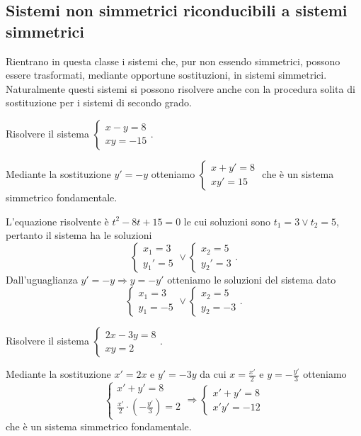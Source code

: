 \subsection{Sistemi non simmetrici riconducibili a sistemi simmetrici}
Rientrano in questa classe i sistemi che, pur non essendo simmetrici, possono essere trasformati, mediante opportune sostituzioni, in sistemi simmetrici. Naturalmente questi sistemi si possono risolvere anche con la procedura solita di sostituzione per i sistemi di secondo grado.

\begin{exrig}
\begin{esempio}
Risolvere il sistema \(\left\{\begin{array}{l}{x-y=8}\\{{xy}=-15}\end{array}\right.\).

Mediante la sostituzione \(y'=-y\) otteniamo \(\left\{\begin{array}{l}{x+y'=8}\\{xy'=15}\end{array}\right.\) che è un sistema simmetrico fondamentale.

L'equazione risolvente è \(t^2-8t+15=0\) le cui soluzioni sono \(t_1=3\vee t_2=5\), pertanto il sistema ha le soluzioni 
\[\left\{\begin{array}{l}{x_1=3}\\
{{y_1}'=5}\end{array}\right.\vee 
\left\{\begin{array}{l}{x_2=5}\\
{{y_2}'=3}\end{array}\right..\] 
Dall'uguaglianza \(y'=-y\Rightarrow y=-y'\) otteniamo le soluzioni del sistema dato 
\[\left\{\begin{array}{l}{x_1=3}\\
{y_1=-5}\end{array}\right.\vee 
\left\{\begin{array}{l}{x_2=5}\\
{y_2=-3}\end{array}\right..\]
\end{esempio}

\begin{esempio}
Risolvere il sistema \(\left\{\begin{array}{l}{2x-3y=8}\\{{xy}=2}\end{array}\right.\).

Mediante la sostituzione \(x'=2x\) e \(y'=-3y\) da cui \(x=\frac{x'} 2\) e \(y=-\frac{y'} 3\) otteniamo 
\[\left\{\begin{array}{l}{x'+y'=8}\\
{\frac{x'} 2\cdot \left(-\frac{y'} 3\right)=2}\end{array}\right.
\Rightarrow\left\{\begin{array}{l}{x'+y'=8}\\
{x'y'=-12}\end{array}\right.\] che è un sistema simmetrico fondamentale.


\end{esempio}
\end{exrig}

